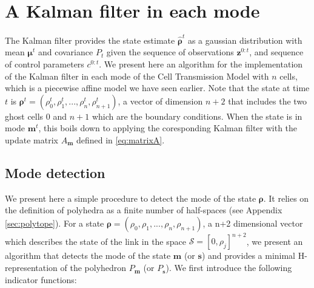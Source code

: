 \section{A Kalman filter in each mode}

The Kalman filter provides the state estimate $\hat{\boldsymbol\rho}^{t}$ as a gaussian distribution with mean $\boldsymbol\mu^{t}$ and covariance $P_{t}$ given the sequence of observations $\boldsymbol z^{0:t}$, and sequence of control parameters $c^{0:t}$. We present here an algorithm for the implementation of the Kalman filter in each mode of the Cell Transmission Model with $n$ cells, which is a piecewise affine model we have seen earlier\footnotemark. Note that the state at time $t$ is $\boldsymbol\rho^{t} = (\rho^{t}_{0},\rho^{t}_{1},...,\rho^{t}_{n},\rho^{t}_{n+1})$, a vector of dimension $n+2$ that includes the two ghost cells $0$ and $n+1$ which are the boundary conditions. When the state is in mode $\boldsymbol m^{t}$, this boils down to applying the coresponding Kalman filter with the update matrix $A_{\boldsymbol m}$ defined in \ref{eq:matrixA}.


\subsection{Mode detection}

We present here a simple procedure to detect the mode of the state $\boldsymbol\rho$. It relies on the definition of polyhedra as a finite number of half-spaces (see Appendix \ref{sec:polytope}). For a state $\boldsymbol\rho = (\rho_{0},\rho_{1},...,\rho_{n},\rho_{n+1})$, a n+2 dimensional vector which describes the state of the link in the space $\mathcal{S} = [0,\rho_{j}]^{n+2}$, we present an algorithm that detects the mode of the state $\boldsymbol m$ (or $\boldsymbol s$) and provides a minimal H-representation of the polyhedron $P_{\boldsymbol m}$ (or $P_{\boldsymbol s}$). We first introduce the following indicator functions:

